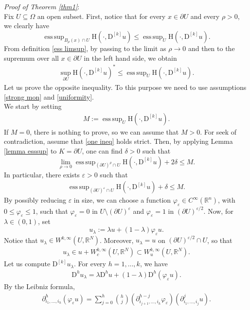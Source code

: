 \documentclass[a4paper,11pt]{article}
\numberwithin{equation}{section}
\newcommand{\numberset}{\mathbb}
\newcommand{\eps}{\varepsilon}
\newcommand{\Om}{\Omega}
\newcommand{\R}{\numberset{R}}
\newcommand{\rom}{\mathrm}
\DeclareMathOperator*{\esssup}{ess\,sup}
\theoremstyle{definition}
\begin{document}
\textit{Proof of Theorem \ref{thm1}}:\\
Fix $U\subseteq\Om$ an open subset. First, notice that for every $x\in\partial U$ and every $\rho>0$, we clearly have
$$
\esssup_{B_\rho(x)\cap U}\rom{H}(\cdot,\mathrm D^{[k]}u)\leq \esssup_{ U}\rom{H}(\cdot,\mathrm D^{[k]}u).
$$ 
From definition \ref{ess limsup}, by passing to the limit as $\rho\to0$ and then to the supremum over all $x\in\partial U$ in the left hand side, we obtain
\begin{align}\label{one ineq}
\sup_{\partial U}\rom{H}(\cdot,\mathrm D ^{[k]}u)^*\leq\esssup_U \rom{H}(\cdot, \mathrm D ^{[k]}u).
\end{align}
Let us prove the opposite inequality. To this purpose we need to use assumptions \eqref{strong mon} and \eqref{uniformity}.\\
We start by setting 
\begin{align}\label{M}
M:=\esssup_U \rom{H}(\cdot, \mathrm D ^{[k]}u).
\end{align}
If $M=0$, there is nothing to prove, so we can assume that $M>0$.
For seek of contradiction, assume that \eqref{one ineq} holds strict. Then, by applying Lemma \ref{lemma esssup} to $K=\partial U$, one can find $\delta>0$ such that
$$
\lim_{\rho\to0}\esssup_{(\partial U)^\rho\cap U}\rom{H}(\cdot, \mathrm D ^{[k]}u)+2\delta\leq M.
$$
In particular, there exists $\eps>0$ such that
\begin{align}\label{from contr}
\esssup_{(\partial U)^{\eps}\cap U}\rom{H}(\cdot, \mathrm D ^{[k]}u)+\delta\leq M.
\end{align}
By possibly reducing $\eps$ in size, we can choose a function $\varphi_\eps\in C^\infty(\R^n)$, with $0\leq\varphi_\eps\leq1$, such that $\varphi_\eps=0$ in $U\setminus (\partial U)^\eps$ and $\varphi_\eps=1$ in $(\partial U)^{\eps/2}$. Now, for $\lambda\in(0,1)$, set
$$
u_\lambda:=\lambda u + (1-\lambda)\varphi_\eps u.
$$
Notice that $u_\lambda\in W^{k,\infty}{(U,\R^N)}$. Moreover, $u_\lambda=u$ on $(\partial U)^{\eps/2}\cap U$, so that 
\begin{align}\label{u lambda}
u_\lambda\in u+W^{k,\infty}_c(U,\R^N)\subset W_u^{k,\infty}(U,\R^N).
\end{align}
Let us compute $\mathrm D^{[k]} u_\lambda$.  For every $h=1,\ldots, k$, we have
\begin{align}\label{deriv product}
\mathrm D^hu_\lambda=\lambda \mathrm D^h u+(1-\lambda)\mathrm D^h(\varphi_\eps u).
\end{align}
By the Leibniz formula,
\begin{align*}
\partial ^h_{i_1,\ldots,i_h}(\varphi_\eps u)=\sum_{j=0}^h \binom{h}{j}(\partial^{h-j}_{i_{j+1},\ldots, i_h} \varphi_\eps)(\partial^{j}_{i_{1},\ldots, i_j} u).
\end{align*}
\end{document}
